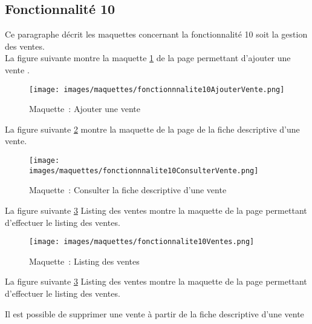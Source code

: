 \subsection{Fonctionnalité 10}
Ce paragraphe décrit les maquettes concernant la fonctionnalité 10 soit la gestion des ventes. \\

La figure suivante montre la maquette \ref{maquette10-5} de la page permettant d'ajouter une vente .
\begin{figure}[H]
	\centering
	\texttt{[image: images/maquettes/fonctionnnalite10AjouterVente.png]}
	\caption{Maquette~: Ajouter une vente}
	\label{maquette10-5}
\end{figure}

La figure suivante \ref{maquette10-3} montre la maquette de la page de la fiche descriptive d'une vente.
\begin{figure}[H]
	\centering
	\texttt{[image: images/maquettes/fonctionnnalite10ConsulterVente.png]}
	\caption{Maquette~: Consulter la fiche descriptive d'une vente}
	\label{maquette10-3}
\end{figure}

La figure suivante \ref{maquette10-4} Listing des ventes montre la maquette de la page permettant d'effectuer le listing des ventes.
\begin{figure}[H]
	\centering
	\texttt{[image: images/maquettes/fonctionnalite10Ventes.png]}
	\caption{Maquette~: Listing des ventes}
	\label{maquette10-4}
\end{figure}

La figure suivante \ref{maquette10-4} Listing des ventes montre la maquette de la page permettant d'effectuer le listing des ventes.

Il est possible de supprimer une vente à partir de la fiche descriptive d'une vente 


